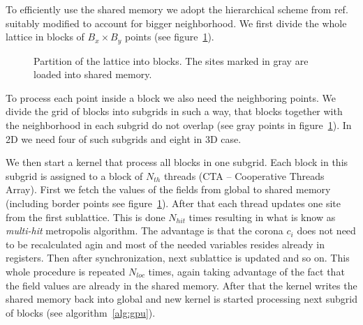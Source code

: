 \documentclass[a4paper]{llncs}
\newcommand{\fillblockgray}[2]{
\pgfmathtruncatemacro\llx{\bksize*(#1)-2}
\pgfmathtruncatemacro\lly{\bksize*(#2)-2}
\pgfmathtruncatemacro\urx{\bksize*(#1+1)+1}
\pgfmathtruncatemacro\ury{\bksize*(#2+1)+1}
\foreach \x in {\llx, ..., \urx}
  \foreach \y in {\lly,...,\ury} {
    \fill[gray] (\x, \y) circle(.25);
  }
}
\newcommand{\npartition}[3]{
\pgfmathtruncatemacro\row{Mod(#2,4)}
\ifnum \row = 0
   \pgfmathtruncatemacro\num{Mod(#1,4)}
\else \ifnum \row  = 1
   \pgfmathtruncatemacro\num{Mod(#1,4)+4}
\else \ifnum \row  = 2
   \pgfmathtruncatemacro\num{Mod(Mod(#1,4)+2,4)}
\else \ifnum \row  = 3
   \pgfmathtruncatemacro\num{Mod(Mod(#1,4)+2,4)+4}
\fi
\fi
\fi
\fi
\ifnum \num = #3
\draw[draw=black,fill=red] (#1, #2) circle(0.4);
\fi

}
\newcommand{\markpartition}[3]{
\pgfmathtruncatemacro\llx{\bksize*(#1)}
\pgfmathtruncatemacro\lly{\bksize*(#2)}
\pgfmathtruncatemacro\urx{\bksize*(#1+1)-1}
\pgfmathtruncatemacro\ury{\bksize*(#2+1)-1}
\foreach \x in {\llx, ..., \urx}
  \foreach \y in {\lly,...,\ury} {
    \npartition{\x}{\y}{#3}
  }
}
\def\bksize{8}
\def\bkcount{4}
\def\lcsize{5}
\begin{document}
To efficiently use the shared memory  we adopt the hierarchical scheme from
ref.~\cite{weigel} suitably modified to account for bigger
neighborhood.  We first divide the whole lattice in blocks of
$B_x\times B_y$ points (see figure~\ref{fig:blocks}). 
\begin{figure} 
\begin{center}

\end{center}
\caption{\label{fig:blocks}Partition of the lattice into
  blocks.  The sites 
marked in gray are loaded into shared memory.}
\end{figure}
To process each point inside a block we also need the neighboring
points.  We divide the grid of blocks into subgrids in such a way,
that blocks together with the neighborhood in each subgrid do not
overlap (see gray points in figure~\ref{fig:blocks}). In 2D we need
four of such subgrids and eight in 3D case.

We then start a kernel that process all blocks in one subgrid.  Each
block in this subgrid is assigned to a block of $N_{th}$ threads (CTA
-- Cooperative Threads Array). First we fetch the values of the fields
from global to shared memory (including border points see
figure~\ref{fig:blocks}).  After that each thread updates one site
from the first sublattice. This is done $N_{hit}$ times resulting in
what is know as {\em multi-hit} metropolis algorithm. The advantage is
that the corona $c_i$ does not need to be recalculated agin and most
of the needed variables resides already in registers.  Then after
synchronization, next sublattice is updated and so on. This whole
procedure is repeated $N_{loc}$ times, again taking advantage of
the fact that the field values are already in the shared memory. After
that the kernel writes the shared memory back into global and new
kernel is started processing next subgrid of blocks (see
algorithm~\ref{alg:gpu}).
\end{document}

